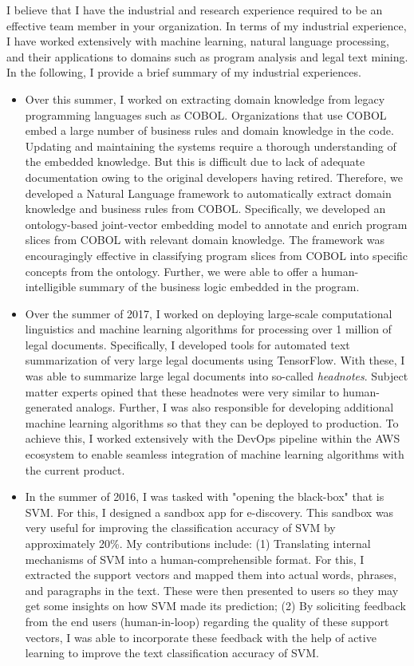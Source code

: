 \documentclass[10pt,letterpaper,sans]{moderncv}         \moderncvstyle{casual}
\begin{document}
I believe that I have the industrial and research experience required to be an effective team member in your organization. In terms of my industrial experience, I have worked extensively with machine learning, natural language processing, and their applications to domains such as program analysis and legal text mining. 
In the following, I provide a brief summary of my industrial experiences.\\[0.33cm]
\begin{itemize}
\item Over this summer, I worked on extracting domain knowledge from legacy programming languages such as COBOL. Organizations that use COBOL embed a large number of business rules and domain knowledge in the code. Updating and maintaining the systems require a thorough understanding of the embedded knowledge. But this is difficult due to lack of adequate documentation owing to the original developers having retired. Therefore, we developed a Natural Language framework to automatically extract domain knowledge and business rules from COBOL. Specifically, we developed an ontology-based joint-vector embedding model to annotate and enrich program slices from COBOL with relevant domain knowledge. The framework was encouragingly effective in classifying program slices from COBOL into specific concepts from the ontology. Further, we were able to offer a human-intelligible summary of the business logic embedded in the program.\\[0.1cm]
\item Over the summer of 2017, I worked on deploying large-scale computational linguistics and machine learning algorithms for processing over 1 million of legal documents. Specifically, I developed tools for automated text summarization of very large legal documents using TensorFlow. With these, I was able to summarize large legal documents into so-called \textit{headnotes}. Subject matter experts opined that these headnotes were very similar to human-generated analogs. Further, I was also responsible for developing additional machine learning algorithms so that they can be deployed to production. To achieve this, I worked extensively with the DevOps pipeline within the AWS ecosystem to enable seamless integration of machine learning algorithms with the current product.\\[0.1cm]
\item In the summer of 2016, I was tasked with "opening the black-box" that is SVM. For this, I designed a sandbox app for e-discovery. This sandbox was very useful for improving the classification accuracy of SVM by approximately 20\%. My contributions include: (1) Translating internal mechanisms of SVM into a human-comprehensible format. For this, I extracted the support vectors and mapped them into actual words, phrases, and paragraphs in the text. These were then presented to users so they may get some insights on how SVM made its prediction; (2) By soliciting feedback from the end users (human-in-loop) regarding the quality of these support vectors, I was able to incorporate these feedback with the help of active learning to improve the text classification accuracy of SVM.\\[0.1cm]
 

\end{itemize}
\end{document}
